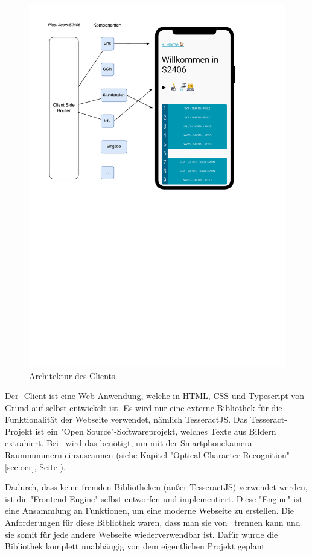 
\begin{figure}[H]
    \centering
    \includegraphics[width=120mm]{media/Intro/client_arch.svg.pdf}
    \caption{Architektur des Clients}
\end{figure}

Der \ZELIA-Client ist eine Web-Anwendung, welche in HTML, CSS und Typescript von Grund auf selbst entwickelt ist. Es wird nur eine externe Bibliothek für die Funktionalität der Webseite verwendet, nämlich TesseractJS. Das Tesseract-Projekt ist ein "Open Source"-Softwareprojekt, welches Texte aus Bildern extrahiert. Bei \ZELIA\ wird das benötigt, um mit der Smartphonekamera Raumnummern einzuscannen (siehe Kapitel "Optical Character Recognition" \ref{sec:ocr}, Seite \pageref{sec:ocr}).

Dadurch, dass keine fremden Bibliotheken (außer TesseractJS) verwendet werden, ist die "Frontend-Engine" selbst entworfen und implementiert. Diese "Engine" ist eine Ansammlung an Funktionen, um eine moderne Webseite zu erstellen. Die Anforderungen für diese Bibliothek waren, dass man sie von \ZELIA\ trennen kann und sie somit für jede andere Webseite wiederverwendbar ist. Dafür wurde die Bibliothek komplett unabhängig von dem eigentlichen Projekt geplant. 


